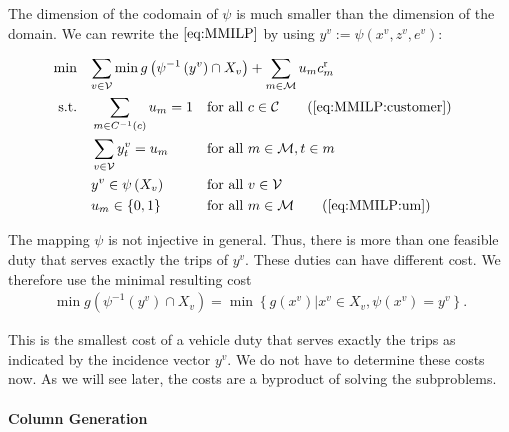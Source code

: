 The dimension of the codomain of $\psi$ is much smaller than the dimension of the domain. We can rewrite the $\eqref{eq:MMILP}$ by using $y^v:=\psi\left(x^v,z^v,e^v\right)$:

\begin{align}
	\min \quad & \omit\rlap{$\displaystyle{\sum_{v\in\mathcal{V}}\min g\left(\psi^{-1}\left(y^v\right)\cap X_v\right) + \sum_{m\in\mathcal{M}}u_m\croute_m}$} \nonumber \\
	\text{s.t.} \quad & \sum_{m\in C^{-1}(c)} u_m = 1 && \text{for all } c\in\mathcal{C} \tag{\ref{eq:MMILP:customer}} \\
	& \sum_{v\in\mathcal{V}}y^v_t = u_m && \text{for all } m\in\mathcal{M},t\in m \label{eq:MMILP:linking_y} \\
	& y^v\in \psi\left(X_v\right) && \text{for all } v\in\mathcal{V} \nonumber \\
	& u_m\in\{0,1\} && \text{for all } m\in\mathcal{M} \tag{\ref{eq:MMILP:um}}
\end{align}

The mapping $\psi$ is not injective in general. Thus, there is more than one feasible duty that serves exactly the trips of $y^v$. These duties can have different cost. We therefore use the minimal resulting cost
\begin{align*}
	\min g\left(\psi^{-1}\left(y^v\right)\cap X_v\right) = \min \left\{g\left(x^v\right)|x^v\in X_v, \psi\left(x^v\right)=y^v\right\}.
\end{align*}

This is the smallest cost of a vehicle duty that serves exactly the trips as indicated by the incidence vector $y^v$. We do not have to determine these costs now. As we will see later, the costs are a byproduct of solving the subproblems.

\paragraph{Column Generation} \parfill

